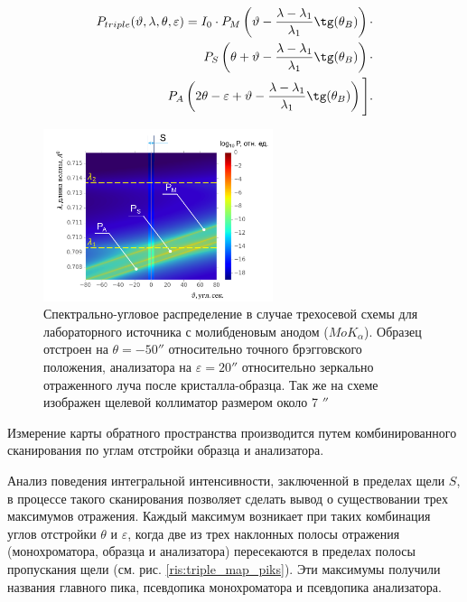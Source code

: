 \begin{eqnarray} \label{eq:triplr_spectra_angle_map}
  P_{triple}(\vartheta,\lambda,\theta,\varepsilon) =I_0\cdot
    P_M \left(\vartheta - \frac{\lambda - \lambda_1}{\lambda_1}\tg(\theta_B) \right) \cdot \nonumber \\
   P_S \left(\theta + \vartheta - \frac{\lambda - \lambda_1}{\lambda_1}\tg(\theta_B)\right)  \cdot  \nonumber \\
   P_A \left(2\theta - \varepsilon + \vartheta - \frac{\lambda - \lambda_1}{\lambda_1}\tg(\theta_B)\right) \Bigg].
 \end{eqnarray}

  \begin{figure}[H]
    \centering
    \includegraphics[width=0.6\textwidth]{images/triple_map.png}
    \caption{Спектрально-угловое распределение в случае трехосевой схемы
    для лабораторного источника с молибденовым анодом ($MoK_{\alpha}$).
    Образец отстроен на $\theta = - 50''$ относительно точного брэгговского положения,
    анализатора на $\varepsilon = 20''$ относительно
    зеркально отраженного луча после кристалла-образца. Так же на схеме изображен
    щелевой коллиматор размером около 7 $''$}
    \label{ris:triple_map}
  \end{figure}

Измерение карты обратного пространства производится путем комбинированного
сканирования по углам отстройки образца и анализатора.

Анализ поведения интегральной интенсивности, заключенной в пределах щели $S$,
в процессе такого сканирования позволяет сделать вывод о существовании трех
максимумов отражения. Каждый максимум возникает при таких комбинация углов отстройки
$\theta$ и $\varepsilon$, когда две из трех наклонных полосы отражения (монохроматора,
образца и анализатора) пересекаются в пределах полосы пропускания щели (см. рис. \ref{ris:triple_map_piks}).
Эти максимумы получили названия главного пика, псевдопика монохроматора и псевдопика анализатора.

